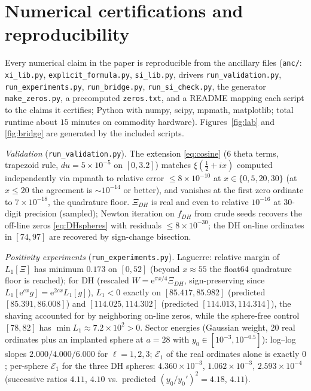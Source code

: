 \documentclass[11pt]{amsart}
\theoremstyle{plain}
\theoremstyle{definition}
\theoremstyle{remark}
\newcommand{\eE}{\mathrm{e}}
\newcommand{\EE}{\mathcal{E}}
\begin{document}
\section{Numerical certifications and reproducibility}\label{sec:numerics}

Every numerical claim in the paper is reproducible from the ancillary files
(\texttt{anc/}: \texttt{xi\_lib.py}, \texttt{explicit\_formula.py}, \texttt{si\_lib.py},
drivers \texttt{run\_validation.py}, \texttt{run\_experiments.py}, \texttt{run\_bridge.py},
\texttt{run\_si\_check.py}, the generator \texttt{make\_zeros.py}, a precomputed
\texttt{zeros.txt}, and a README mapping each script to the claims it certifies; Python with
numpy, scipy, mpmath, matplotlib; total runtime about $15$ minutes on commodity hardware).
Figures~\ref{fig:lab} and \ref{fig:bridge} are generated by the included scripts.

\emph{Validation} (\texttt{run\_validation.py}). The extension \eqref{eq:cosine} ($6$ theta
terms, trapezoid rule, $du=5\times10^{-5}$ on $[0,3.2]$) matches $\xi(\tfrac12+ix)$ computed
independently via mpmath to relative error $\le8\times10^{-10}$ at $x\in\{0,5,20,30\}$
(at $x\le20$ the agreement is $\sim10^{-14}$ or better), and vanishes at the first zero ordinate
to $7\times10^{-18}$, the quadrature floor. $\Xi_{DH}$ is real and even to relative $10^{-16}$
at $30$-digit precision (sampled); Newton iteration on $f_{DH}$ from crude seeds recovers the
off-line zeros \eqref{eq:DHspheres} with residuals $\le8\times10^{-30}$; the DH on-line
ordinates in $[74,97]$ are recovered by sign-change bisection.

\emph{Positivity experiments} (\texttt{run\_experiments.py}). Laguerre: relative margin of
$L_1[\Xi]$ has minimum $0.173$ on $[0,52]$ (beyond $x\approx55$ the float64 quadrature floor is
reached); for DH (rescaled $W=\eE^{\pi x/4}\Xi_{DH}$, sign-preserving since
$L_1[\eE^{cx}g]=\eE^{2cx}L_1[g]$), $L_1<0$ exactly on $[85.417,85.982]$ (predicted
$[85.391,86.008]$) and $[114.025,114.302]$ (predicted $[114.013,114.314]$), the shaving
accounted for by neighboring on-line zeros, while the sphere-free control $[78,82]$ has
$\min L_1\approx7.2\times10^2>0$. Sector energies (Gaussian weight, $20$ real ordinates plus an
implanted sphere at $a=28$ with $y_0\in[10^{-3},10^{-0.5}]$): log--log slopes
$2.000/4.000/6.000$ for $\ell=1,2,3$; $\EE_1$ of the real ordinates alone is exactly $0$;
per-sphere $\EE_1$ for the three DH spheres: $4.360\times10^{-3}$, $1.062\times10^{-3}$,
$2.593\times10^{-4}$ (successive ratios $4.11$, $4.10$ vs.\ predicted $(y_0/y_0')^2=4.18$,
$4.11$).
\end{document}
